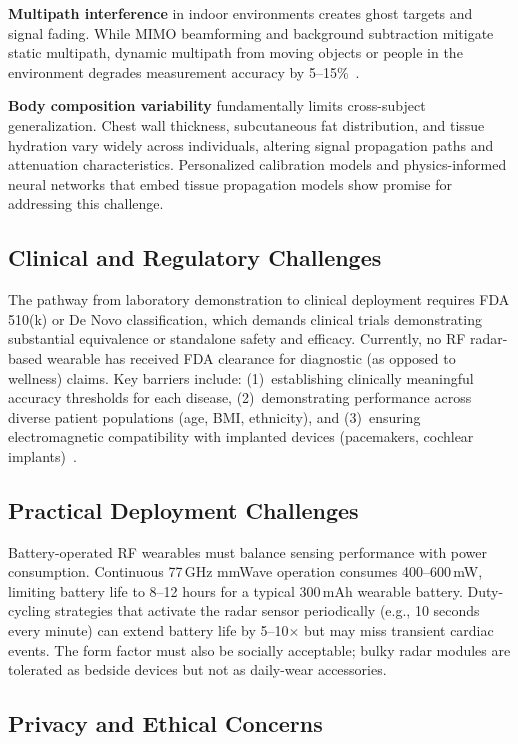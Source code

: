 \documentclass[journal,twoside]{IEEEtran}
\begin{document}
\textbf{Multipath interference} in indoor environments creates ghost targets and signal fading. While MIMO beamforming and background subtraction mitigate static multipath, dynamic multipath from moving objects or people in the environment degrades measurement accuracy by 5--15\%~\cite{ref_multiscenario2025}.

\textbf{Body composition variability} fundamentally limits cross-subject generalization. Chest wall thickness, subcutaneous fat distribution, and tissue hydration vary widely across individuals, altering signal propagation paths and attenuation characteristics. Personalized calibration models and physics-informed neural networks that embed tissue propagation models show promise for addressing this challenge.

\subsection{Clinical and Regulatory Challenges}

The pathway from laboratory demonstration to clinical deployment requires FDA 510(k) or De Novo classification, which demands clinical trials demonstrating substantial equivalence or standalone safety and efficacy. Currently, no RF radar-based wearable has received FDA clearance for diagnostic (as opposed to wellness) claims. Key barriers include: (1)~establishing clinically meaningful accuracy thresholds for each disease, (2)~demonstrating performance across diverse patient populations (age, BMI, ethnicity), and (3)~ensuring electromagnetic compatibility with implanted devices (pacemakers, cochlear implants)~\cite{ref_rf_exposure2023}.

\subsection{Practical Deployment Challenges}

Battery-operated RF wearables must balance sensing performance with power consumption. Continuous 77\,GHz mmWave operation consumes 400--600\,mW, limiting battery life to 8--12 hours for a typical 300\,mAh wearable battery. Duty-cycling strategies that activate the radar sensor periodically (e.g., 10 seconds every minute) can extend battery life by 5--10$\times$ but may miss transient cardiac events. The form factor must also be socially acceptable; bulky radar modules are tolerated as bedside devices but not as daily-wear accessories.

\subsection{Privacy and Ethical Concerns}
\end{document}
